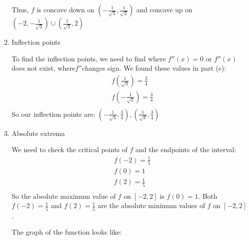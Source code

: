 \documentclass[handout,nooutcomes]{ximera}
\begin{document}
\begin{problem}
\begin{enumerate}
\begin{freeResponse}
		
		
		Thus, $f$ is concave down on $\left( - \frac{1}{\sqrt{3}}, \frac{1}{\sqrt{3}} \right)$ and concave up on \\ 
		$\left( -2, - \frac{1}{\sqrt{3}} \right) \cup \left( \frac{1}{\sqrt{3}}, 2 \right)$
		\end{freeResponse}
		
	\item  Inflection points
	
		\begin{freeResponse}
		To find the inflection points, we need to find where $f''(x)=0$ or $f''(x)$ does not exist,  where$f''$changes sign.  We found these values in part (e):
		\begin{align*}
 		 & f\left( \frac{1}{\sqrt{3}} \right)=\frac{3}{4} \\ 
 		& f\left( -\frac{1}{\sqrt{3}} \right)=\frac{3}{4} \\ 
		\end{align*}  
		So our inflection points are: $\left( -\frac{1}{\sqrt{3}},\frac{3}{4} \right),\left( \frac{1}{\sqrt{3}},\frac{3}{4} \right)$
		\end{freeResponse}
		
	\item  Absolute extrema
	
		\begin{freeResponse}
		We need to check the critical points of $f$ and the endpoints of the interval:
		\begin{align*}
  		& f(-2)=\frac{1}{5} \\ 
 		& f(0)=1 \\ 
 		& f(2)=\frac{1}{5} \\ 
		\end{align*}
		So the absolute maximum value of $f$ on $[-2,2]$ is $f(0)=1$.  Both $f(-2)=\frac{1}{5}$ and $f(2)=\frac{1}{5}$ are the absolute minimum values of $f$ on $[-2,2]$.
		
		The graph of the function looks like:
		
\begin{center}
\begin{image}
\end{image}
\end{center}
\end{freeResponse}
\end{enumerate}
\end{problem}
\end{document}
